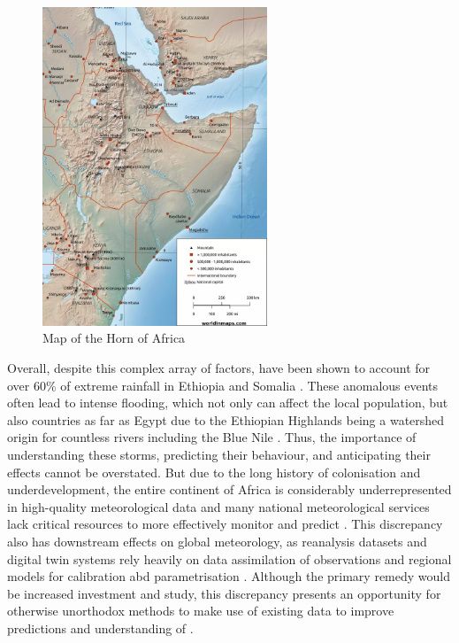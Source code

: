 \begin{figure}[h]
    \centering
    \includegraphics[width=0.6\textwidth]{../figures/static/horn-of-africa-map-scaled.jpeg}
    \caption{Map of the Horn of Africa \citep{WorldInMaps2024}}
    \label{fig:horn-of-africa}
\end{figure}

Overall, despite this complex array of factors,  have been shown to account for over 60\% of extreme rainfall in Ethiopia and Somalia \citep{Hill2023}. These anomalous events often lead to intense flooding, which not only can affect the local population, but also countries as far as Egypt due to the Ethiopian Highlands being a watershed origin for countless rivers including the Blue Nile \citep{Legese2020,Zaroug2014}. Thus, the importance of understanding these storms, predicting their behaviour, and anticipating their effects cannot be overstated. But due to the long history of colonisation and underdevelopment, the entire continent of Africa is considerably underrepresented in high-quality meteorological data and many national meteorological services lack critical resources to more effectively monitor and predict  \citep{Dinku2019,Kinyondo2018,Meque2021}. This discrepancy also has downstream effects on global meteorology, as reanalysis datasets and digital twin systems rely heavily on data assimilation of observations and regional models for calibration abd parametrisation \citep{Linsenmeier2023,Valmassoi2023}. Although the primary remedy would be increased investment and study, this discrepancy presents an opportunity for otherwise unorthodox methods to make use of existing data to improve predictions and understanding of .

